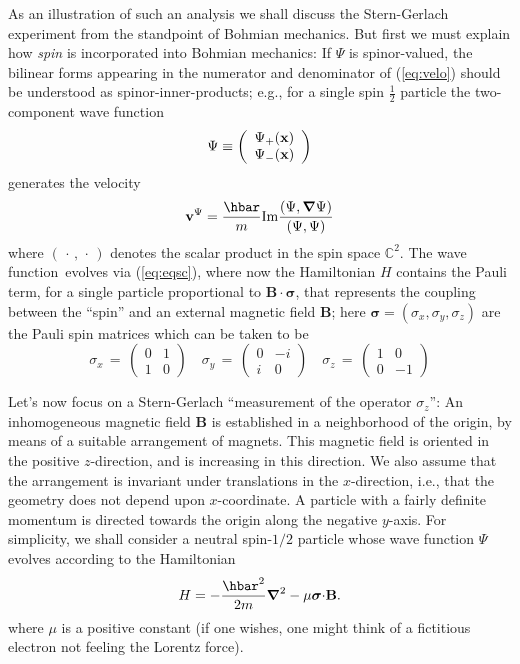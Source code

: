 \documentclass[12pt]{article}
\newcommand{\BM}{Bohmian mechanics}
\newcommand{\wf}{wave function}
\newcommand{\CC}{\mathbb{C}}
\begin{document}
As an illustration of such an analysis we shall discuss the
Stern-Gerlach experiment {}from the standpoint of \BM. But first we
must explain how {\it spin} is incorporated into \BM: If $\Psi$ is
spinor-valued, the bilinear forms appearing in the numerator and
denominator of (\ref{eq:velo}) should be understood as
spinor-inner-products; e.g., for a single spin $\frac{1}{2}$ particle
the two-component \wf{} $$
\Psi \equiv \left(\begin{array}{c} \Psi_+
     ({\bf x})\\ \Psi_- ({\bf x})
\end{array} \right) $$
generates the velocity
\begin{equation}
\label{vspin}
{\bf v}^{\Psi} = \frac{\hbar}{m}{\rm Im}
\frac{(\Psi,\boldsymbol{\nabla}\Psi)} {(\Psi, \Psi)}
\end{equation}
where $(\,\cdot\,,\,\cdot\,)$ denotes the scalar product in the spin
space $\CC^{2}$.  The \wf\ evolves via (\ref{eq:eqsc}), where now the
Hamiltonian $H$ contains the Pauli term, for a single particle
proportional to $\mathbf{B}\cdot\boldsymbol{ \sigma}$, that represents
the coupling between the ``spin'' and an external magnetic field
$\mathbf{B}$; here $\boldsymbol{\sigma} =(\sigma_x,\sigma_y,\sigma_z)$
are the Pauli spin matrices which can be taken to be
$$
\sigma_x \,=\, \left(\begin{array}{cc} 0 & 1 \\ 1 & 0\end{array}
\right) \quad \sigma_y\,=\, \left( \begin{array}{cc} 0 & -i \\ i& 0
\end{array} \right) \quad \sigma_z\,=\, \left( \begin{array}{cc} 1 &
0\\ 0& -1 \end{array} \right)
$$


Let's now focus on a Stern-Gerlach ``measurement of the operator
$\sigma_z$'': An inhomogeneous magnetic field $\mathbf{B}$ is
established in a neighborhood of the origin, by means of a suitable
arrangement of magnets.  This magnetic field is oriented in the
positive $z$-direction, and is increasing in this direction.  We also
assume that the arrangement is invariant under translations in the
$x$-direction, i.e., that the geometry does not depend upon
$x$-coordinate.  A particle with a fairly definite momentum is
directed towards the origin along the negative $y$-axis.  For
simplicity, we shall consider a neutral spin-$1/2$ particle whose
\wf{} $\Psi$ evolves according to the Hamiltonian
\begin{equation}
\label{sgh}
H = -\frac{\hbar^{2}}{2m} \boldsymbol{\nabla}^{2}  -
\mu\boldsymbol{\sigma}{\bf \cdot B}.
\end{equation}
where $\mu$ is a positive constant (if one wishes, one might think of
a fictitious electron not feeling the Lorentz force).
\end{document}
